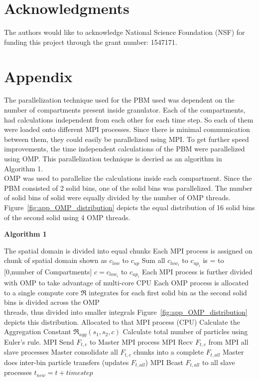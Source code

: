 \documentclass[preprint,11pt,authoryear]{elsarticle}
\begin{document}
\section{Acknowledgments}
The authors would like to acknowledge National Science Foundation (NSF) for 
funding this project
through the grant number: 1547171.
\section*{Appendix}
The parallelization technique used for the PBM used was dependent on the number of compartments present inside 
granulator. Each of the compartments, had calculations independent from each other for each time step. So each of them were
loaded onto different MPI processes. Since there is minimal communication between them, they could easily be parallelized using MPI. 
To get further speed improvements, the time independent calculations of the PBM were parallelized using OMP. 
This parallelization technique is decried as an algorithm in Algorithm 1. \\
OMP was used to parallelize the calculations inside each compartment. Since the PBM consisted of 2 solid bins, one of 
the solid bins was parallelized. The number of solid bins of solid were equally divided by the number of OMP threads. 
Figure~\ref{fig:app_OMP_distribution} depicts the equal distribution of 16 solid bins of the second solid using 4 OMP 
threads.
\begin{algorithm}[H]
    \caption*{\textbf{Algorithm 1}}
    \label{alg:MyAlgorithm}
    \begin{algorithmic}[1]
        
        \State The spatial domain is divided into equal chunks
        \State Each MPI process is assigned on chunk of spatial domain shown as $c_{low}$ to $c_{up}$ 
        \State Sum all $c_{low_i}$ to $c_{up_i}$ is = to [0,number of Compartments]
         $c = c_{low_i}$ to $c_{up_i}$
        \State Each MPI process is further divided with OMP to take advantage of multi-core CPU
        \State Each OMP process is allocated to a single compute core
        \State $\Re$ integrates for each first solid bin as the second solid bins is 
        divided across the OMP\\ \hspace{1.05cm} threads, thus divided into smaller integrals 
        Figure~\ref{fig:app_OMP_distribution} depicts this distribution.
        \State Allocated to that MPI process (CPU)
        \State Calculate the Aggregation Constant $\Re_{agg}(s_1,s_2,c)$
        \EndFor
        \State Calculate total number of particles using Euler's rule.
        \EndFor
            \State MPI Send $F_{t,c}$ to Master MPI process
            \State MPI Recv $F_{t,c}$ from MPI all slave processes
            \State Master consolidate all $F_{t,c}$ chunks into a complete $F_{t,all}$
            \State Master does inter-bin particle transfers (updates $F_{t,all}$)
            \State MPI Bcast $F_{t,all}$ to all slave processes
            \State $t_{new} = t + timestep$
        \EndWhile        
    \end{algorithmic}
\end{algorithm}  
 
\end{document}
